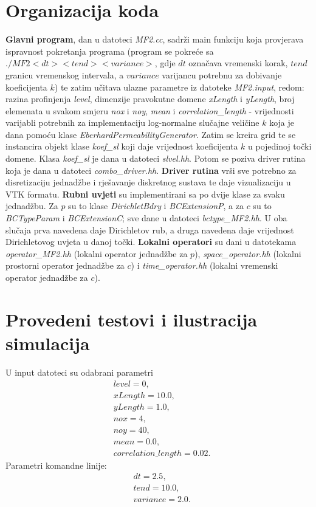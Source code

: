 \documentclass[a4paper,12pt]{article}
\begin{document}
\section{Organizacija koda}
\textbf{Glavni program}, dan u datoteci \textit{MF2.cc}, sadrži main funkciju koja provjerava ispravnost pokretanja programa (program se pokreće sa $./MF2 <dt> <tend> <variance>$, gdje $dt$ označava vremenski korak, $tend$ granicu vremenskog intervala, a $variance$ varijancu potrebnu za dobivanje koeficijenta $k$) te zatim učitava ulazne parametre iz datoteke \textit{MF2.input}, redom: razina profinjenja \textit{level}, dimenzije pravokutne domene \textit{xLength} i \textit{yLength}, broj elemenata u svakom smjeru \textit{nox} i \textit{noy}, \textit{mean} i \textit{correlation\_length} - vrijednosti varijabli potrebnih za implementaciju log-normalne slučajne veličine $k$ koja je dana pomoću klase \textit{EberhardPermeabilityGenerator}. Zatim se kreira grid te se instancira objekt klase \textit{koef\_sl} koji daje vrijednost koeficijenta $k$ u pojedinoj točki domene. Klasa \textit{koef\_sl} je dana u datoteci \textit{slvel.hh}. Potom se poziva driver rutina koja je dana u datoteci \textit{combo\_driver.hh}. \textbf{Driver rutina} vrši sve potrebno za disretizaciju jednadžbe i rješavanje diskretnog sustava te daje vizualizaciju u VTK formatu. \textbf{Rubni uvjeti} su implementirani sa po dvije klase za svaku jednadžbu. Za $p$ su to klase \textit{DirichletBdry} i \textit{BCExtensionP}, a za $c$ su to \textit{BCTypeParam} i \textit{BCExtensionC}; sve dane u datoteci \textit{bctype\_MF2.hh}. U oba slučaja prva navedena daje Dirichletov rub, a druga navedena daje vrijednost Dirichletovog uvjeta u danoj točki. \textbf{Lokalni operatori} su dani u datotekama \textit{operator\_MF2.hh} (lokalni operator jednadžbe za $p$), \textit{space\_operator.hh} (lokalni prostorni operator jednadžbe za $c$) i \textit{time\_operator.hh} (lokalni vremenski operator jednadžbe za $c$).

\section{Provedeni testovi i ilustracija simulacija}

U input datoteci su odabrani parametri
\begin{align*}
&level = 0, \\
&xLength = 10.0, \\
&yLength = 1.0, \\
&nox = 4, \\
&noy = 40, \\
&mean = 0.0, \\
&correlation\_length = 0.02.
\end{align*}
Parametri komandne linije:
\begin{align*}
&dt = 2.5,\\
&tend = 10.0, \\
&variance = 2.0.
\end{align*}
\end{document}
